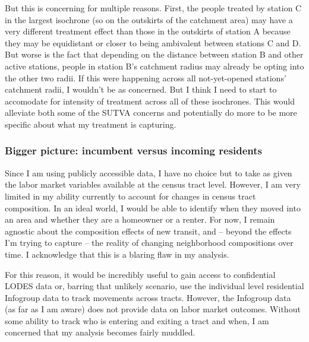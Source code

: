 \documentclass[12pt]{article}
\begin{document}
\begin{figure}[H]
    \centering
\end{figure}
But this is concerning for multiple reasons. First, the people treated by station C in the largest isochrone (so on the outskirts of the catchment area) may have a very different treatment effect than those in the outskirts of station A because they may be equidistant or closer to being ambivalent between stations C and D. But worse is the fact that depending on the distance between station B and other active stations, people in station B's catchment radius may already be opting into the other two radii. If this were happening across all not-yet-opened stations' catchment radii, I wouldn't be as concerned. But I think I need to start to accomodate for intensity of treatment across all of these isochrones. This would alleviate both some of the SUTVA concerns and potentially do more to be more specific about what my treatment is capturing. 

\subsubsection{Bigger picture: incumbent versus incoming residents}\label{subsubsec:incumbents}
Since I am using publicly accessible data, I have no choice but to take as given the labor market variables available at the census tract level. However, I am very limited in my ability currently to account for changes in census tract composition. In an ideal world, I would be able to identify when they moved into an area and whether they are a homeowner or a renter. For now, I remain agnostic about the composition effects of new transit, and  --  beyond the effects I'm trying to capture  --  the reality of changing neighborhood compositions over time. I acknowledge that this is a blaring flaw in my analysis. 

For this reason, it would be incredibly useful to gain access to confidential LODES data or, barring that unlikely scenario, use the individual level residential Infogroup data to track movements across tracts. However, the Infogroup data (as far as I am aware) does not provide data on labor market outcomes. Without some ability to track who is entering and exiting a tract and when, I am concerned that my analysis becomes fairly muddled. 
\end{document}
